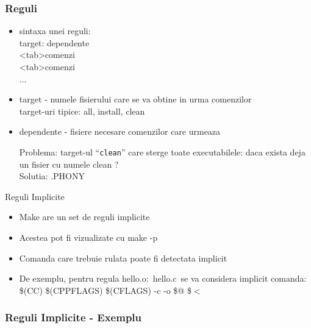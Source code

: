 \documentclass{beamer}
\begin{document}
    \begin{frame}[allowframebreaks]
    \frametitle{Reguli}
    \begin{itemize}
    \setlength{\itemsep}{0.3cm}
    \item sintaxa unei reguli:\\ {\ttfamily target: dependente\\ <tab>comenzi\\ <tab>comenzi\\ ...}
    \item target - numele fisierului care se va obtine in urma comenzilor\\target-uri tipice: all, install, clean
    \item dependente - fisiere necesare comenzilor care urmeaza
    \begin{item} Problema: target-ul ``\texttt{clean}'' care sterge toate executabilele: daca exista deja un fisier cu numele clean ?\\Solutia: .PHONY\\
    \vspace{0.3cm}
    
    \end{item}
    \end{itemize}
    \end{frame}

    \begin{frame}{Reguli Implicite}
    \begin{itemize}
    \setlength{\itemsep}{0.5cm}
    \item Make are un set de reguli implicite
    \item Acestea pot fi vizualizate cu {\ttfamily make -p}
    \item Comanda care trebuie rulata poate fi detectata implicit
    \item De exemplu, pentru regula {\ttfamily hello.o:\ hello.c}\ se va
considera implicit comanda:\\ {\ttfamily \$(CC) \$(CPPFLAGS) \$(CFLAGS) -c -o \$@ \$$<$}
    \end{itemize}
    \end{frame}

    \begin{frame}[allowframebreaks]
    \frametitle{Reguli Implicite - Exemplu}
    \\
    \framebreak
    \\
    \framebreak
    \\
    \framebreak
    
    \end{frame}
    
\end{document}
